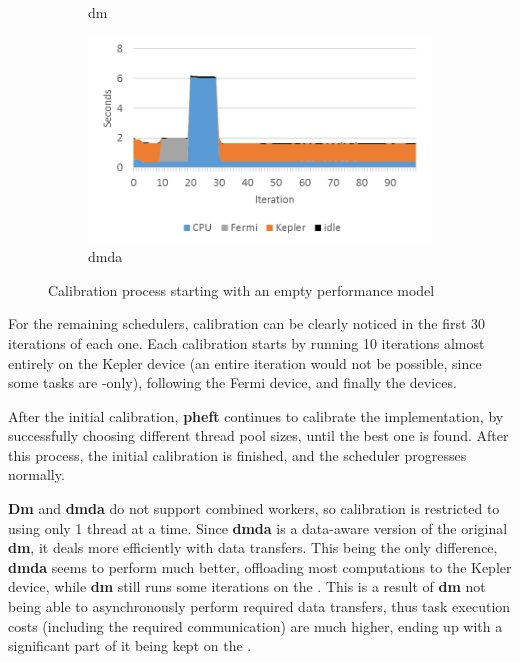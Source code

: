 \documentclass[main.tex]{subfiles}
\begin{document}
\begin{figure}[!htp]
\begin{subfigure}{.5\textwidth}
    \caption{dm \label{fig:prof:starpu_calibrate_dm}}
  \end{subfigure}%
  \begin{subfigure}{.5\textwidth}
    \centering
    \includegraphics[width=\linewidth]{profiling/starpu_calibrate_dmda}
    \caption{dmda \label{fig:prof:starpu_calibrate_dmda}}
  \end{subfigure}
  \caption{Calibration process starting with an empty performance model \label{fig:prof:starpu_calibrate}}
\end{figure}

For the remaining schedulers, calibration can be clearly noticed in the first 30 iterations of each one. Each calibration starts by running 10 iterations almost entirely on the Kepler device (an entire iteration would not be possible, since some tasks are \cpu-only), following the Fermi device, and finally the \cpu devices.

After the initial calibration, \textbf{pheft} continues to calibrate the \cpu implementation, by successfully choosing different thread pool sizes, until the best one is found. After this process, the initial calibration is finished, and the scheduler progresses normally.

\textbf{Dm} and \textbf{dmda} do not support combined workers, so \cpu calibration is restricted to using only 1 \cpu thread at a time. Since \textbf{dmda} is a data-aware version of the original \textbf{dm}, it deals more efficiently with data transfers. This being the only difference, \textbf{dmda} seems to perform much better, offloading most computations to the Kepler device, while \textbf{dm} still runs some iterations on the \cpu. This is a result of \textbf{dm} not being able to asynchronously perform required data transfers, thus \gpu task execution costs (including the required communication) are much higher, ending up with a significant part of it being kept on the \cpu.
\end{document}
